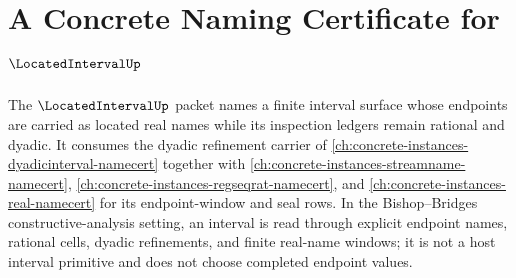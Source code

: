 \chapter{A Concrete Naming Certificate for $\LocatedIntervalUp$}
\label{ch:concrete-instances-locatedinterval-namecert}

The $\LocatedIntervalUp$ packet names a finite interval surface whose endpoints are carried as located real names while its inspection ledgers remain rational and dyadic. It consumes the dyadic refinement carrier of \autoref{ch:concrete-instances-dyadicinterval-namecert} together with \autoref{ch:concrete-instances-streamname-namecert}, \autoref{ch:concrete-instances-regseqrat-namecert}, and \autoref{ch:concrete-instances-real-namecert} for its endpoint-window and seal rows. In the Bishop--Bridges constructive-analysis setting, an interval is read through explicit endpoint names, rational cells, dyadic refinements, and finite real-name windows; it is not a host interval primitive and does not choose completed endpoint values.

